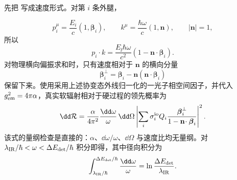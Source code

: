 \begin{derivation}
先把 写成速度形式。对第 $i$ 条外腿，

\begin{equation*}
 p_i^\mu=\frac{E_i}{c}(1,\boldsymbol\beta_i),
 \qquad
 k^\mu=\frac{\hbar\omega}{c}(1,\mathbf n),
 \qquad
 |\mathbf n|=1,
\end{equation*}
所以
\begin{equation*}
 p_i\!\cdot k
 =\frac{E_\ii\hbar\omega}{c^2}
 (1-\mathbf n\!\cdot\boldsymbol\beta_i).
\end{equation*}
对物理横向偏振求和时，只有速度相对于 $\mathbf n$ 的横向分量
\begin{equation*}
 \boldsymbol\beta_i^\perp
 =\boldsymbol\beta_i-\mathbf n(\mathbf n\!\cdot\boldsymbol\beta_i)
\end{equation*}
保留下来。使用采用上述协变态外线归一化的一光子相空间因子，并代入 $g_{\rm em}^2=4\pi\alpha$，真实软辐射相对于硬过程的领先概率为
\begin{equation*}
 \dd\mathcal R
 =\frac{\alpha}{4\pi^2}
 \frac{\dd\omega}{\omega}\,\dd\Omega
 \left|
 \sum_i\sigma_i^{\rm io}Q_i
 \frac{\boldsymbol\beta_i^\perp}
 {1-\mathbf n\!\cdot\boldsymbol\beta_i}
 \right|^2.
\end{equation*}
该式的量纲检查是直接的：$\alpha$、$\dd\omega/\omega$、$\dd\Omega$ 与速度比均无量纲。对
$\lambda_{\rm IR}/\hbar<\omega<\Delta E_{\rm det}/\hbar$ 积分即得，其中径向积分为
\begin{equation*}
 \int_{\lambda_{\rm IR}/\hbar}^{\Delta E_{\rm det}/\hbar}
 \frac{\dd\omega}{\omega}
 =\ln\frac{\Delta E_{\rm det}}{\lambda_{\rm IR}}.
\end{equation*}
\end{derivation}

